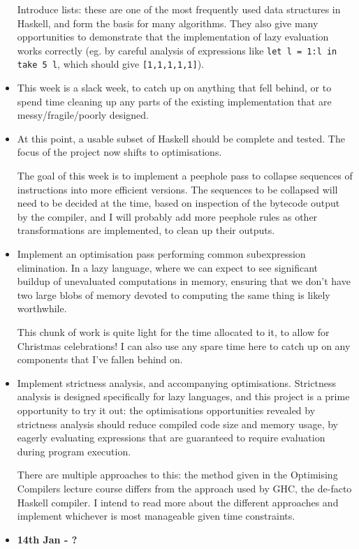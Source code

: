 \documentclass[12pt]{article}
\newcommand\haskell[1]{\texttt{#1}}
\begin{document}
\begin{itemize}
{    Introduce lists: these are one of the most frequently used data structures in Haskell, and form the basis for many
    algorithms. They also give many opportunities to demonstrate that the implementation of lazy evaluation works
    correctly (eg. by careful analysis of expressions like \haskell{let l = 1:l in take 5 l}, which should give
    \haskell{[1,1,1,1,1]}).
}
\item
{

    This week is a slack week, to catch up on anything that fell behind, or to spend time cleaning up any parts of the
    existing implementation that are messy/fragile/poorly designed.
}
\item
{

    At this point, a usable subset of Haskell should be complete and tested. The focus of the project now shifts to optimisations.

    The goal of this week is to implement a peephole pass to collapse sequences of instructions into more efficient
    versions. The sequences to be collapsed will need to be decided at the time, based on inspection of the bytecode
    output by the compiler, and I will probably add more peephole rules as other transformations are implemented, to clean
    up their outputs.
}
\item
{

    Implement an optimisation pass performing common subexpression elimination. In a lazy language, where we can expect
    to see significant buildup of unevaluated computations in memory, ensuring that we don't have two large blobs of
    memory devoted to computing the same thing is likely worthwhile.

    This chunk of work is quite light for the time allocated to it, to allow for Christmas celebrations! I can also use
    any spare time here to catch up on any components that I've fallen behind on.
}
\item
{

    Implement strictness analysis, and accompanying optimisations. Strictness analysis is designed specifically for lazy
    languages, and this project is a prime opportunity to try it out: the optimisations opportunities revealed by
    strictness analysis should reduce compiled code size and memory usage, by eagerly evaluating expressions that are
    guaranteed to require evaluation during program execution.

    There are multiple approaches to this: the method given in the Optimising Compilers lecture course differs from the
    approach used by GHC, the de-facto Haskell compiler. I intend to read more about the different approaches and
    implement whichever is most manageable given time constraints.
}
\item
{
    \textbf{14th Jan - ?}

}
\end{itemize}
\end{document}

